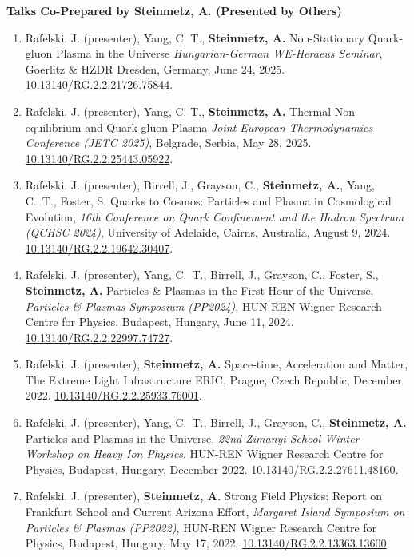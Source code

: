\documentclass[11pt]{article}
\begin{document}
{\large\textbf{Talks Co-Prepared by Steinmetz, A. (Presented by Others)}}

\begin{enumerate}[leftmargin=*,nosep]
    \item Rafelski, J. (presenter), Yang, C. T., \textbf{Steinmetz, A.} Non-Stationary Quark-gluon Plasma in the Universe \textit{Hungarian-German WE-Heraeus Seminar}, Goerlitz \& HZDR Dresden, Germany, June 24, 2025. \href{http://dx.doi.org/10.13140/RG.2.2.21726.75844}{10.13140/RG.2.2.21726.75844}.
    \item Rafelski, J. (presenter), Yang, C. T., \textbf{Steinmetz, A.} Thermal Non-equilibrium and Quark-gluon Plasma \textit{Joint European Thermodynamics Conference (JETC 2025)}, Belgrade, Serbia, May 28, 2025.\\ \href{http://dx.doi.org/10.13140/RG.2.2.25443.05922}{10.13140/RG.2.2.25443.05922}.
    \item Rafelski, J. (presenter), Birrell, J., Grayson, C., \textbf{Steinmetz, A.}, Yang, C.~T., Foster, S. Quarks to Cosmos: Particles and Plasma in Cosmological Evolution, \textit{16th Conference on Quark Confinement and the Hadron Spectrum (QCHSC 2024)}, University of Adelaide, Cairns, Australia, August 9, 2024.\\ \href{http://dx.doi.org/10.13140/RG.2.2.19642.30407}{10.13140/RG.2.2.19642.30407}.
    \item Rafelski, J. (presenter), Yang, C.~T., Birrell, J., Grayson, C., Foster, S., \textbf{Steinmetz, A.} Particles \& Plasmas in the First Hour of the Universe, \textit{Particles \& Plasmas Symposium (PP2024)}, HUN-REN Wigner Research Centre for Physics, Budapest, Hungary, June 11, 2024. \href{http://dx.doi.org/10.13140/RG.2.2.22997.74727}{10.13140/RG.2.2.22997.74727}.
    \item Rafelski, J. (presenter), \textbf{Steinmetz, A.} Space-time, Acceleration and Matter, The Extreme Light Infrastructure ERIC, Prague, Czech Republic, December 2022. \href{http://dx.doi.org/10.13140/RG.2.2.25933.76001}{10.13140/RG.2.2.25933.76001}.
    \item Rafelski, J. (presenter), Yang, C.~T., Birrell, J., Grayson, C., \textbf{Steinmetz, A.} Particles and Plasmas in the Universe, \textit{22nd Zimanyi School Winter Workshop on Heavy Ion Physics}, HUN-REN Wigner Research Centre for Physics, Budapest, Hungary, December 2022. \href{http://dx.doi.org/10.13140/RG.2.2.27611.48160}{10.13140/RG.2.2.27611.48160}.
    \item Rafelski, J. (presenter), \textbf{Steinmetz, A.} Strong Field Physics: Report on Frankfurt School and Current Arizona Effort, \textit{Margaret Island Symposium on Particles \& Plasmas (PP2022)}, HUN-REN Wigner Research Centre for Physics, Budapest, Hungary, May 17, 2022. \href{http://dx.doi.org/10.13140/RG.2.2.13363.13600}{10.13140/RG.2.2.13363.13600}.
\end{enumerate}
\end{document}
